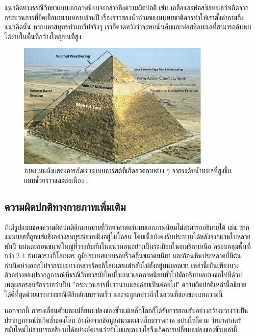 \documentclass[10pt,twocolumn,letterpaper]{article}
\begin{document}
แนวคิดทางธรณีวิทยาแบบเอกภาพนิยมจะกล่าวถึงความผิดปกติ เช่น เกลือและฟอสซิลทะเลว่าเกิดจากกระบวนการที่ยืดเยื้อมานานหลายล้านปี เรื่องราวของน้ำท่วมของมนุษยชาติควรทำให้เราตั้งคำถามถึงแนวคิดนั้น  หากมหาสมุทรท่วมทวีปจริงๆ  เราก็คาดหวังว่าจะพบน้ำเค็มและฟอสซิลทะเลที่สามารถค้นพบได้ง่ายในพื้นที่กว้างใหญ่บนที่สูง

\begin{figure}[t]
\begin{center}
\includegraphics[width=0.85\textwidth]{khafre.jpg}
\end{center}
   \caption{ภาพแผนผังแสดงการกัดเซาะแบบคาร์สต์ที่เกิดลวดลายต่าง ๆ จากระดับน้ำทะเลที่สูงขึ้นแบบชั่วคราวและต่อเนื่อง \cite{27}.}
\label{fig:4}

\end{figure}

\subsection{ความผิดปกติทางกายภาพเพิ่มเติม}

ยังมีรูปแบบของความผิดปกติอีกมากมายที่วิทยาศาสตร์แบบเอกภาพนิยมไม่สามารถอธิบายได้ เช่น ซากแมมมอธที่ถูกแช่แข็งอย่างสมบูรณ์แบบฝังอยู่ในโคลน โดยเนื้อยังคงรับประทานได้หลังจากผ่านไปหลายพันปี \cite{17,18,19} แผ่นตะกอนขนาดใหญ่ที่วางทับกันในแนวนอนอย่างเป็นระเบียบในอเมริกาเหนือ ครอบคลุมพื้นที่กว่า 2.4 ล้านตารางกิโลเมตร\cite{21} ภูมิประเทศแบบรอยริ้วคลื่นขนาดมหึมา \cite{22} และก้อนหินประหลาดที่มีต้นกำเนิดห่างออกไปจากระยะทางหลายร้อยกิโลเมตรแต่กลับไปตั้งอยู่บนยอดเขา \cite{23,26} เหล่านี้เป็นเพียงบางตัวอย่างของปรากฏการณ์ที่ธรณีวิทยาสมัยใหม่ในแนวเอกภาพนิยมทั่วไปมักอธิบายอย่างขอไปทีด้วยเหตุผลครอบจักรวาลว่าเป็น "กระบวนการที่ยาวนานและค่อยเป็นค่อยไป" ความผิดปกติเหล่านี้อธิบายได้ดีที่สุดด้วยแรงทางธรณีฟิสิกส์แบบรวดเร็ว และจะถูกกล่าวถึงในส่วนที่สองของบทความนี้

นอกจากนี้ การเคลื่อนตัวและเปลี่ยนแปลงของขั้วแม่เหล็กโลกก็ได้รับการยอมรับอย่างกว้างขวางว่าเป็นปรากฏการณ์ที่เกิดซ้ำของโลก อ้างอิงจากข้อมูลสนามแม่เหล็กบรรพกาล  \cite{35,40,41} อย่างไรก็ตาม วิทยาศาสตร์สมัยใหม่ไม่สามารถอธิบายได้อย่างชัดเจนว่าทำไมและอย่างไรจึงเกิดการเปลี่ยนแปลงของขั้วเหล่านี้
\end{document}
